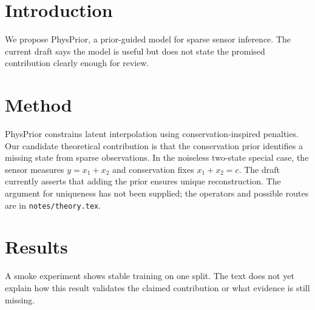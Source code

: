 \section{Introduction}
We propose PhysPrior, a prior-guided model for sparse sensor inference. The current draft says the model is useful but does not state the promised contribution clearly enough for review.

\section{Method}
PhysPrior constrains latent interpolation using conservation-inspired penalties.
Our candidate theoretical contribution is that the conservation prior identifies a missing state from sparse observations. In the noiseless two-state special case, the sensor measures $y=x_1+x_2$ and conservation fixes $x_1+x_2=c$. The draft currently asserts that adding the prior ensures unique reconstruction. The argument for uniqueness has not been supplied; the operators and possible routes are in \texttt{notes/theory.tex}.

\section{Results}
A smoke experiment shows stable training on one split. The text does not yet explain how this result validates the claimed contribution or what evidence is still missing.
